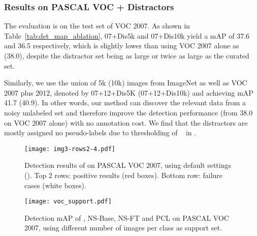 \documentclass[review]{elsarticle}
\begin{document}
\subsubsection{Results on PASCAL VOC + Distractors}
  The evaluation is on the test set of VOC 2007. As shown in Table~\ref{tab:det_map_ablation}, 07+Dis5k and 07+Dis10k yield a mAP of 37.6 and 36.5 respectively, which is slightly lower than using VOC 2007 alone as  (38.0), despite the distractor set being as large or twice as large as the curated set.

Similarly, we use the union of 5k (10k) images from ImageNet as well as VOC 2007 plus 2012, denoted by 07+12+Dis5K (07+12+Dis10k) and achieving mAP 41.7 (40.9).
In other words, our method can discover the relevant data from a noisy unlabeled set and therefore improve the detection performance (\eg from 38.0 on VOC 2007 alone) with no annotation cost.     
We find that the distractors
are mostly assigned no pseudo-labels due to thresholding of ~ in \ours. 






\begin{figure*}[t]
    \centering
	\texttt{[image: img3-rows2-4.pdf]}
	\caption{\small Detection results of \ours on PASCAL VOC 2007, using default settings ().
		Top 2 rows: positive results (red boxes). Bottom row: failure cases (white boxes).
	}
	\label{Fig:result}
\end{figure*}





\begin{figure}[t]
    \centering
	\texttt{[image: voc\_support.pdf]}
	\caption{\small Detection mAP of \ours, NS-Base, NS-FT and PCL on PASCAL VOC 2007, using different number  of images per class as support set.
	}
	\label{Fig:result_voc_support}
\end{figure}
\end{document}
